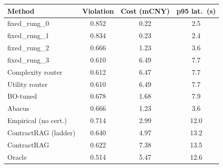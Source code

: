 \begin{tabular}{lccc}
\toprule
Method & Violation & Cost (mCNY) & p95 lat.\ (s) \\
\midrule
fixed_rung_0 & 0.852 & 0.22 & 2.5 \\
fixed_rung_1 & 0.834 & 0.23 & 2.4 \\
fixed_rung_2 & 0.666 & 1.23 & 3.6 \\
fixed_rung_3 & 0.610 & 6.49 & 7.7 \\
Complexity router & 0.612 & 6.47 & 7.7 \\
Utility router & 0.610 & 6.49 & 7.7 \\
BO-tuned & 0.678 & 1.68 & 7.9 \\
Abacus & 0.666 & 1.23 & 3.6 \\
Empirical (no cert.) & 0.714 & 2.99 & 12.0 \\
ContractRAG (ladder) & 0.640 & 4.97 & 13.2 \\
ContractRAG & 0.622 & 7.38 & 13.5 \\
Oracle & 0.514 & 5.47 & 12.6 \\
\bottomrule
\end{tabular}